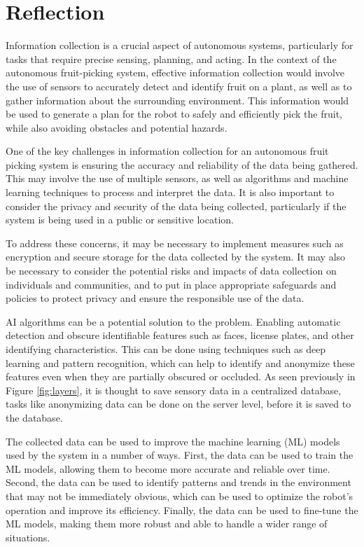 \documentclass[%
oneside,    %
project,    %
nosummary   %
]{USN-MSc}
\begin{document}
\section{Reflection}
Information collection is a crucial aspect of autonomous systems, particularly for tasks that require precise sensing, planning, and acting. In the context of the autonomous fruit-picking system, effective information collection would involve the use of sensors to accurately detect and identify fruit on a plant, as well as to gather information about the surrounding environment. This information would be used to generate a plan for the robot to safely and efficiently pick the fruit, while also avoiding obstacles and potential hazards.

One of the key challenges in information collection for an autonomous fruit picking system is ensuring the accuracy and reliability of the data being gathered. This may involve the use of multiple sensors, as well as algorithms and machine learning techniques to process and interpret the data. It is also important to consider the privacy and security of the data being collected, particularly if the system is being used in a public or sensitive location.

To address these concerns, it may be necessary to implement measures such as encryption and secure storage for the data collected by the system. It may also be necessary to consider the potential risks and impacts of data collection on individuals and communities, and to put in place appropriate safeguards and policies to protect privacy and ensure the responsible use of the data.

AI algorithms can be a potential solution to the problem. Enabling automatic detection and obscure identifiable features such as faces, license plates, and other identifying characteristics. This can be done using techniques such as deep learning and pattern recognition, which can help to identify and anonymize these features even when they are partially obscured or occluded. As seen previously in Figure \ref{fig:layers}, it is thought to save sensory data in a centralized database, tasks like anonymizing data can be done on the server level, before it is saved to the database.

The collected data can be used to improve the machine learning (ML) models used by the system in a number of ways. First, the data can be used to train the ML models, allowing them to become more accurate and reliable over time. Second, the data can be used to identify patterns and trends in the environment that may not be immediately obvious, which can be used to optimize the robot's operation and improve its efficiency. Finally, the data can be used to fine-tune the ML models, making them more robust and able to handle a wider range of situations.
\end{document}
